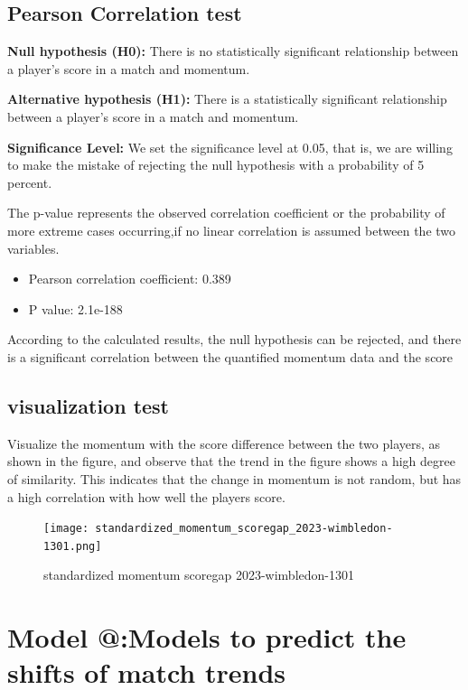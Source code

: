 \documentclass{mcmthesis}  %
\makeatletter
\newcommand{\Rmnum}[1]{\expandafter\@slowromancap\romannumeral #1@}
\makeatother
\begin{document}
\subsection{Pearson Correlation test}
\hspace{1.5em}\textbf{Null hypothesis (H0):} There is no statistically significant relationship between a player's score in a match and  momentum. 
\par\textbf{Alternative hypothesis (H1):} There is a statistically significant relationship between a player's score in a match and momentum. 
\par\textbf{Significance Level:} We set the significance level at 0.05, that is, we are willing to make the mistake of rejecting the null hypothesis with a probability of 5 percent.
\par The p-value represents the observed correlation coefficient or the probability of more extreme cases occurring,if no linear correlation is assumed between the two variables.
\begin{itemize}
    \item Pearson correlation coefficient: 0.389
    \item  P value: 2.1e-188
\end{itemize}
\par According to the calculated results, the null hypothesis can be rejected, and there is a significant correlation between the quantified momentum data and the score

\subsection{visualization test}

\hspace{1.5em}Visualize the momentum with the score difference between the two players, as 
shown in the figure, and observe that the trend in the figure shows a high degree of similarity. This indicates that the change in momentum is not random, but has a high correlation with how well the players score.

\begin{figure}[!htb]  %
\small
\centering  %
\texttt{[image: standardized\_momentum\_scoregap\_2023-wimbledon-1301.png]}  %
\caption{standardized momentum scoregap 2023-wimbledon-1301} \label{fig:standardized_momentum_scoregap_2023-wimbledon-1301.png}  %
\end{figure}  %
\newpage
\section{Model \Rmnum{2}:Models to predict the shifts of match trends}
\end{document}
